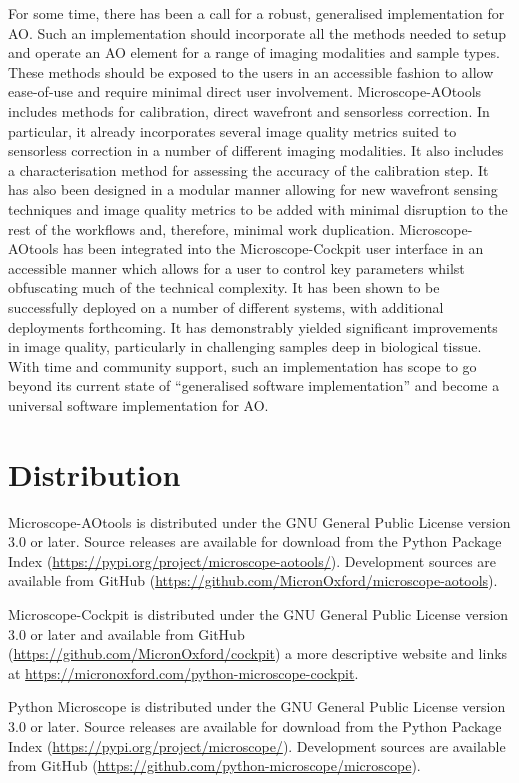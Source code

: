 For some time, there has been a call for a robust, generalised implementation 
for AO. Such an implementation should incorporate all the methods needed to
setup and operate an AO element for a range of imaging modalities and sample 
types. These methods should be exposed to the users in an accessible fashion 
to allow ease-of-use and require minimal direct user involvement. 
Microscope-AOtools includes methods for calibration, direct wavefront and 
sensorless correction. In particular, it already incorporates several image 
quality metrics suited to sensorless correction in a number of different 
imaging modalities. It also includes a characterisation method for assessing 
the accuracy of the calibration step. It has also been designed in a modular 
manner allowing for new wavefront sensing techniques and image quality 
metrics to be added with minimal disruption to the rest of the workflows and, 
therefore, minimal work duplication. Microscope-AOtools has been integrated 
into the Microscope-Cockpit user interface in an accessible manner which 
allows for a user to control key parameters whilst obfuscating much of the 
technical complexity. It has been shown to be successfully deployed on a 
number of different systems, with additional deployments forthcoming. It has 
demonstrably yielded significant improvements in image quality, particularly 
in challenging samples deep in biological tissue. With  time and community 
support, such an implementation has scope to go beyond its  current state of 
``generalised software implementation'' and become a universal software 
implementation for AO.

\section{Distribution}
\label{sec:distribution}

Microscope-AOtools is distributed under the GNU General Public License version 3.0 or later. Source releases are available for download from the Python Package Index (\url{https://pypi.org/project/microscope-aotools/}). Development sources are available from GitHub (\url{https://github.com/MicronOxford/microscope-aotools}).

Microscope-Cockpit is distributed under the GNU General Public License version 3.0 or later and available from GitHub (\url{https://github.com/MicronOxford/cockpit}) a more descriptive website and links at \url{https://micronoxford.com/python-microscope-cockpit}. 

Python Microscope is distributed under the GNU General Public License version 3.0 or later. Source releases are available for download from the Python Package Index (\url{https://pypi.org/project/microscope/}). Development sources are available from GitHub (\url{https://github.com/python-microscope/microscope}).

